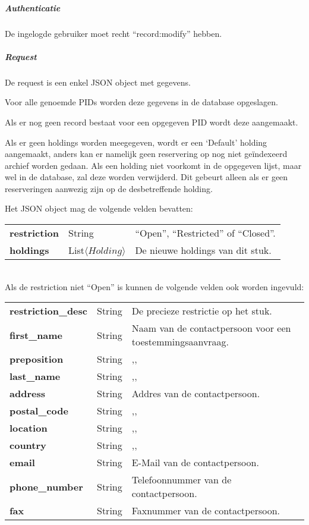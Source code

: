 \documentclass[a4paper,titlepage]{report}
\begin{document}
          \subparagraph{Authenticatie}
            De ingelogde gebruiker moet recht ``record:modify'' hebben.

          \subparagraph{Request}
            De request is een enkel JSON object met gegevens.

            Voor alle genoemde PIDs worden deze gegevens in de
            database opgeslagen.

            Als er nog geen record bestaat voor een opgegeven PID wordt deze
            aangemaakt. 

            Als er geen holdings worden meegegeven, wordt er een `Default'
            holding aangemaakt, anders kan er namelijk geen reservering op nog
            niet ge\"indexeerd archief worden gedaan. Als een holding niet
            voorkomt in de opgegeven lijst, maar wel in de database, zal deze worden
            verwijderd. Dit gebeurt alleen als er geen reserveringen aanwezig
            zijn op de desbetreffende holding.

            Het JSON object mag de volgende velden bevatten:\\

            \begin{tabular}{ l l p{10cm} }
              \textbf{restriction} & String & ``Open'', ``Restricted'' of ``Closed''. \\
              \textbf{holdings} & List$\langle Holding \rangle$ & De nieuwe
              holdings van dit stuk.\\
            \end{tabular}\hfill\\

            Als de  restriction niet ``Open'' is kunnen de volgende velden
            ook worden ingevuld:\\

            \begin{tabular}{ l l p{10cm} }
              \textbf{restriction\_desc} & String & De precieze restrictie op
              het stuk.\\
              \textbf{first\_name} & String & Naam van de contactpersoon voor
              een toestemmingsaanvraag. \\
              \textbf{preposition} & String & ,,\\
              \textbf{last\_name} & String & ,,\\
              \textbf{address} & String & Addres van de contactpersoon.\\
              \textbf{postal\_code} & String & ,,\\
              \textbf{location} & String & ,,\\
              \textbf{country} & String & ,,\\
              \textbf{email} & String & E-Mail van de contactpersoon.\\
              \textbf{phone\_number} & String & Telefoonnummer van de
              contactpersoon.\\
              \textbf{fax} & String & Faxnummer van de contactpersoon.\\
            \end{tabular}
\end{document}
